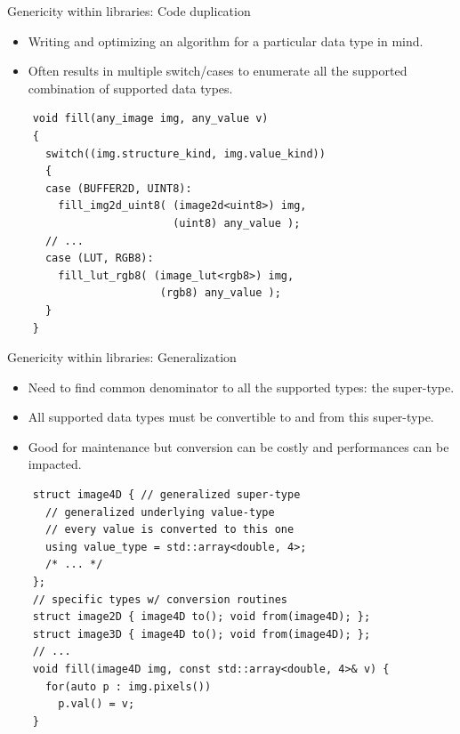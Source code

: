 \documentclass[12pt,aspectratio=169]{beamer}
\begin{document}
\begin{frame}[fragile]{Genericity within libraries: Code duplication}
  \begin{itemize}
    \item Writing and optimizing an algorithm for a particular data type in mind.
    \item Often results in multiple switch/cases to enumerate all the supported combination of supported data types.
  \end{itemize}
  \begin{verbatim}
    void fill(any_image img, any_value v)
    {
      switch((img.structure_kind, img.value_kind)) 
      {
      case (BUFFER2D, UINT8):
        fill_img2d_uint8( (image2d<uint8>) img,
                          (uint8) any_value );
      // ...
      case (LUT, RGB8):
        fill_lut_rgb8( (image_lut<rgb8>) img,
                        (rgb8) any_value );
      }
    }
  \end{verbatim}
\end{frame}

\begin{frame}[fragile]{Genericity within libraries: Generalization}
  \begin{itemize}
    \item Need to find common denominator to all the supported types: the super-type.
    \item All supported data types must be convertible to and from this super-type.
    \item Good for maintenance but conversion can be costly and performances can be impacted.
  \end{itemize}
  \begin{verbatim}
    struct image4D { // generalized super-type
      // generalized underlying value-type
      // every value is converted to this one
      using value_type = std::array<double, 4>;
      /* ... */
    };
    // specific types w/ conversion routines
    struct image2D { image4D to(); void from(image4D); };
    struct image3D { image4D to(); void from(image4D); };
    // ...
    void fill(image4D img, const std::array<double, 4>& v) {
      for(auto p : img.pixels())
        p.val() = v;
    }
  \end{verbatim}
\end{frame}
\end{document}
